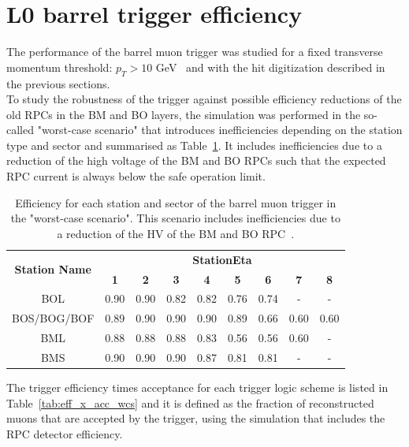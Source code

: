 \section{L0 barrel trigger efficiency}
\label{sec:eff}
The performance of the barrel muon trigger was studied for a fixed transverse momentum threshold: $p_{T} > 10$ GeV~\cite{Marcoccia:2693982} and with the hit digitization described in the previous sections.\\
To study the robustness of the trigger against possible efficiency reductions of the old RPCs in the BM and BO layers, the simulation was performed in the so-called "worst-case scenario" that introduces inefficiencies depending on the station type and sector and summarised as Table~\ref{tab:WCS}. It includes inefficiencies due to a reduction of the high voltage of the BM and BO RPCs such that the expected RPC current is always below the safe operation limit.
\begin{table}[htbp]
	\begin{center}
		\begin{tabular}{c|cccccccc}
			\multirow{2}{*}{\textbf{Station Name}} & \multicolumn{8}{c}{\textbf{StationEta}}\\
			\cline{2-9}
			& \textbf{1} & \textbf{2} & \textbf{3} & \textbf{4} & \textbf{5} & \textbf{6} & \textbf{7} & \textbf{8}\\
			\hline 
			BOL                 				   & 0.90  	    & 0.90		 & 0.82 	  & 0.82 	   & 0.76 		& 0.74 		 & -	      & -    \\
			BOS/BOG/BOF 						   & 0.89 		& 0.90 		 & 0.90 	  & 0.90	   & 0.89 		& 0.66 		 & 0.60       & 0.60 \\
			BML                					   & 0.88		& 0.88 		 & 0.88 	  & 0.83 	   & 0.56 		& 0.56		 & 0.60       & -    \\
			BMS              					   & 0.90  	    & 0.90		 & 0.90 	  & 0.87 	   & 0.81 	    & 0.81    	 & -          & -    \\
			\hline 
		\end{tabular} 
		\caption{Efficiency for each station and sector of the barrel muon trigger in the "worst-case scenario". This scenario includes inefficiencies due to a reduction of the HV of the BM and BO RPC~\cite{Marcoccia:2693982}.} 
		\label{tab:WCS}
	\end{center} 
\end{table} 
\noindent The trigger efficiency times acceptance for each trigger logic scheme is listed in Table~\ref{tab:eff_x_acc_wcs} and it is defined as the fraction of reconstructed muons that are accepted by the trigger, using the simulation that includes the RPC detector efficiency.
